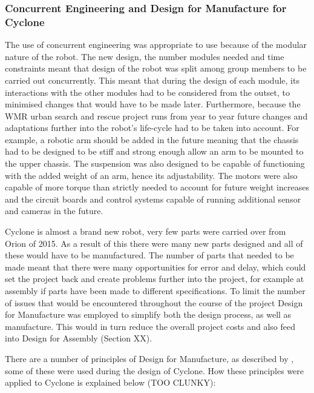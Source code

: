 \subsubsection{Concurrent Engineering and Design for Manufacture for Cyclone}
The use of concurrent engineering was appropriate to use because of the modular nature of the robot. The new design, the number modules needed and time constraints meant that design of the robot was split among group members to be carried out concurrently. This meant that during the design of each module, its interactions with the other modules had to be considered from the outset, to minimised changes that would have to be made later. Furthermore, because the WMR urban search and rescue project runs from year to year future changes and adaptations further into the robot’s life-cycle had to be taken into account. For example, a robotic arm should be added in the future meaning that the chassis had to be designed to be stiff and strong enough allow an arm to be mounted to the upper chassis. The suspension was also designed to be capable of functioning with the added weight of an arm, hence its adjustability. The motors were also capable of more torque than strictly needed to account for future weight increases and the circuit boards and control systems capable of running additional sensor and cameras in the future.

Cyclone is almost a brand new robot, very few parts were carried over from Orion of 2015. As a result of this there were many new parts designed and all of these would have to be manufactured. The number of parts that needed to be made meant that there were many opportunities for error and delay, which could set the project back and create problems further into the project, for example at assembly if parts have been made to different specifications. To limit the number of issues that would be encountered throughout the course of the project Design for Manufacture was employed to simplify both the design process, as well as manufacture. This would in turn reduce the overall project costs and also feed into Design for Assembly (Section XX).

There are a number of principles of Design for Manufacture, as described by \cite{Chang05}, some of these were used during the design of Cyclone. How these principles were applied to Cyclone is explained below (TOO CLUNKY):


